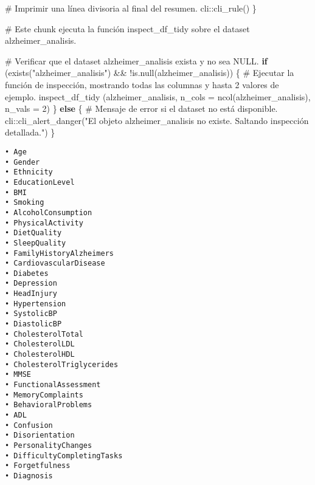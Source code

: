 \documentclass[
  letterpaper,
  DIV=11,
  numbers=noendperiod]{scrartcl}
\newenvironment{Shaded}{\begin{snugshade}}{\end{snugshade}}
\newcommand{\AttributeTok}[1]{\textcolor[rgb]{0.40,0.45,0.13}{#1}}
\newcommand{\CommentTok}[1]{\textcolor[rgb]{0.37,0.37,0.37}{#1}}
\newcommand{\ControlFlowTok}[1]{\textcolor[rgb]{0.00,0.23,0.31}{\textbf{#1}}}
\newcommand{\DecValTok}[1]{\textcolor[rgb]{0.68,0.00,0.00}{#1}}
\newcommand{\FunctionTok}[1]{\textcolor[rgb]{0.28,0.35,0.67}{#1}}
\newcommand{\NormalTok}[1]{\textcolor[rgb]{0.00,0.23,0.31}{#1}}
\newcommand{\SpecialCharTok}[1]{\textcolor[rgb]{0.37,0.37,0.37}{#1}}
\newcommand{\StringTok}[1]{\textcolor[rgb]{0.13,0.47,0.30}{#1}}
\begin{document}
\begin{Shaded}
\begin{Highlighting}[]
  \CommentTok{\# Imprimir una línea divisoria al final del resumen.}
\NormalTok{  cli}\SpecialCharTok{::}\FunctionTok{cli\_rule}\NormalTok{()}
\NormalTok{\}}
\end{Highlighting}
\end{Shaded}

\begin{Shaded}
\begin{Highlighting}[]
\CommentTok{\# Este chunk ejecuta la función \textquotesingle{}inspect\_df\_tidy\textquotesingle{} sobre el dataset \textquotesingle{}alzheimer\_analisis\textquotesingle{}.}

\CommentTok{\# Verificar que el dataset \textquotesingle{}alzheimer\_analisis\textquotesingle{} exista y no sea NULL.}
\ControlFlowTok{if}\NormalTok{ (}\FunctionTok{exists}\NormalTok{(}\StringTok{"alzheimer\_analisis"}\NormalTok{) }\SpecialCharTok{\&\&} \SpecialCharTok{!}\FunctionTok{is.null}\NormalTok{(alzheimer\_analisis)) \{}
  \CommentTok{\# Ejecutar la función de inspección, mostrando todas las columnas y hasta 2 valores de ejemplo.}
  \FunctionTok{inspect\_df\_tidy}\NormalTok{ (alzheimer\_analisis, }\AttributeTok{n\_cols =} \FunctionTok{ncol}\NormalTok{(alzheimer\_analisis), }\AttributeTok{n\_vals =} \DecValTok{2}\NormalTok{)}
\NormalTok{\} }\ControlFlowTok{else}\NormalTok{ \{}
  \CommentTok{\# Mensaje de error si el dataset no está disponible.}
\NormalTok{  cli}\SpecialCharTok{::}\FunctionTok{cli\_alert\_danger}\NormalTok{(}\StringTok{"El objeto \textquotesingle{}alzheimer\_analisis\textquotesingle{} no existe. Saltando inspección detallada."}\NormalTok{)}
\NormalTok{\}}
\end{Highlighting}
\end{Shaded}

\begin{verbatim}
• Age
• Gender
• Ethnicity
• EducationLevel
• BMI
• Smoking
• AlcoholConsumption
• PhysicalActivity
• DietQuality
• SleepQuality
• FamilyHistoryAlzheimers
• CardiovascularDisease
• Diabetes
• Depression
• HeadInjury
• Hypertension
• SystolicBP
• DiastolicBP
• CholesterolTotal
• CholesterolLDL
• CholesterolHDL
• CholesterolTriglycerides
• MMSE
• FunctionalAssessment
• MemoryComplaints
• BehavioralProblems
• ADL
• Confusion
• Disorientation
• PersonalityChanges
• DifficultyCompletingTasks
• Forgetfulness
• Diagnosis 
\end{verbatim}
\end{document}
